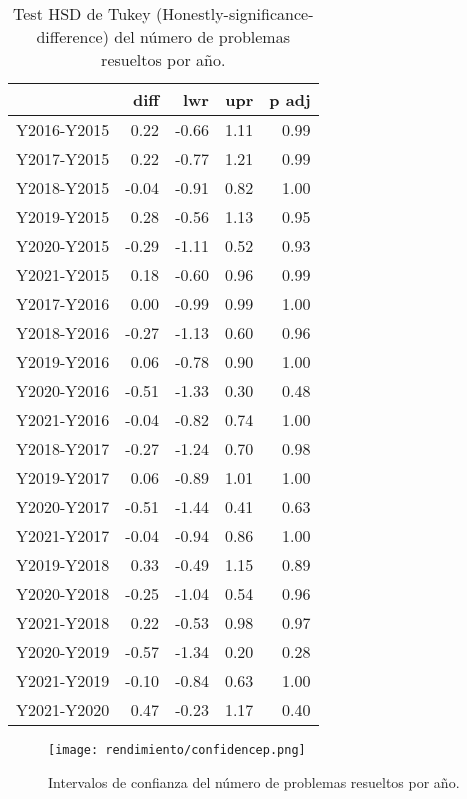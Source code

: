 \begin{table}[ht]
\centering
\caption{Test HSD de Tukey (Honestly-significance-difference) del número de problemas resueltos por año.}
\label{tab:Tukeyperformer}
\begin{tabular}{rrrrr}
  \hline
 & diff & lwr & upr & p adj \\ 
  \hline
Y2016-Y2015 & 0.22 & -0.66 & 1.11 & 0.99 \\ 
  Y2017-Y2015 & 0.22 & -0.77 & 1.21 & 0.99 \\ 
  Y2018-Y2015 & -0.04 & -0.91 & 0.82 & 1.00 \\ 
  Y2019-Y2015 & 0.28 & -0.56 & 1.13 & 0.95 \\ 
  Y2020-Y2015 & -0.29 & -1.11 & 0.52 & 0.93 \\ 
  Y2021-Y2015 & 0.18 & -0.60 & 0.96 & 0.99 \\ 
  Y2017-Y2016 & 0.00 & -0.99 & 0.99 & 1.00 \\ 
  Y2018-Y2016 & -0.27 & -1.13 & 0.60 & 0.96 \\ 
  Y2019-Y2016 & 0.06 & -0.78 & 0.90 & 1.00 \\ 
  Y2020-Y2016 & -0.51 & -1.33 & 0.30 & 0.48 \\ 
  Y2021-Y2016 & -0.04 & -0.82 & 0.74 & 1.00 \\ 
  Y2018-Y2017 & -0.27 & -1.24 & 0.70 & 0.98 \\ 
  Y2019-Y2017 & 0.06 & -0.89 & 1.01 & 1.00 \\ 
  Y2020-Y2017 & -0.51 & -1.44 & 0.41 & 0.63 \\ 
  Y2021-Y2017 & -0.04 & -0.94 & 0.86 & 1.00 \\ 
  Y2019-Y2018 & 0.33 & -0.49 & 1.15 & 0.89 \\ 
  Y2020-Y2018 & -0.25 & -1.04 & 0.54 & 0.96 \\ 
  Y2021-Y2018 & 0.22 & -0.53 & 0.98 & 0.97 \\ 
  Y2020-Y2019 & -0.57 & -1.34 & 0.20 & 0.28 \\ 
  Y2021-Y2019 & -0.10 & -0.84 & 0.63 & 1.00 \\ 
  Y2021-Y2020 & 0.47 & -0.23 & 1.17 & 0.40 \\ 
   \hline
\end{tabular}
\end{table}

\begin{figure}[H]
    \centering
    \texttt{[image: rendimiento/confidencep.png]}
    \caption{Intervalos de confianza del número de problemas resueltos por año.}
    \label{fig:confidenceperformer}
\end{figure}

